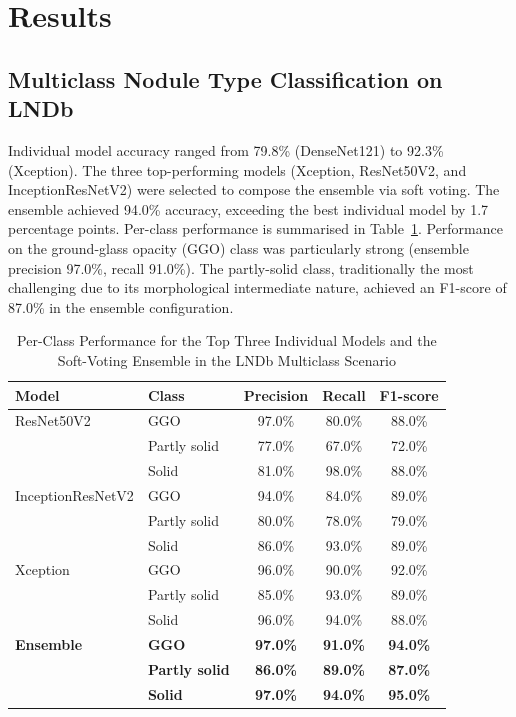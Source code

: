 \documentclass{ieeeaccess}
\begin{document}
\section{Results}
\label{sec:results}

\subsection{Multiclass Nodule Type Classification on LNDb}
Individual model accuracy ranged from 79.8\% (DenseNet121) to 92.3\% (Xception). The three top-performing models (Xception, ResNet50V2, and InceptionResNetV2) were selected to compose the ensemble via soft voting. The ensemble achieved 94.0\% accuracy, exceeding the best individual model by 1.7 percentage points. Per-class performance is summarised in Table~\ref{tab:lndb}. Performance on the ground-glass opacity (GGO) class was particularly strong (ensemble precision 97.0\%, recall 91.0\%). The partly-solid class, traditionally the most challenging due to its morphological intermediate nature, achieved an F1-score of 87.0\% in the ensemble configuration.

\begin{table}[!t]
\caption{Per-Class Performance for the Top Three Individual Models and the Soft-Voting Ensemble in the LNDb Multiclass Scenario}
\label{tab:lndb}
\centering
\begin{tabular}{@{}llccc@{}}
\toprule
\textbf{Model} & \textbf{Class} & \textbf{Precision} & \textbf{Recall} & \textbf{F1-score} \\
\midrule
ResNet50V2 & GGO & 97.0\% & 80.0\% & 88.0\% \\
 & Partly solid & 77.0\% & 67.0\% & 72.0\% \\
 & Solid & 81.0\% & 98.0\% & 88.0\% \\
InceptionResNetV2 & GGO & 94.0\% & 84.0\% & 89.0\% \\
 & Partly solid & 80.0\% & 78.0\% & 79.0\% \\
 & Solid & 86.0\% & 93.0\% & 89.0\% \\
Xception & GGO & 96.0\% & 90.0\% & 92.0\% \\
 & Partly solid & 85.0\% & 93.0\% & 89.0\% \\
 & Solid & 96.0\% & 94.0\% & 88.0\% \\
\textbf{Ensemble} & \textbf{GGO} & \textbf{97.0\%} & \textbf{91.0\%} & \textbf{94.0\%} \\
 & \textbf{Partly solid} & \textbf{86.0\%} & \textbf{89.0\%} & \textbf{87.0\%} \\
 & \textbf{Solid} & \textbf{97.0\%} & \textbf{94.0\%} & \textbf{95.0\%} \\
\bottomrule
\end{tabular}
\end{table}
\end{document}
